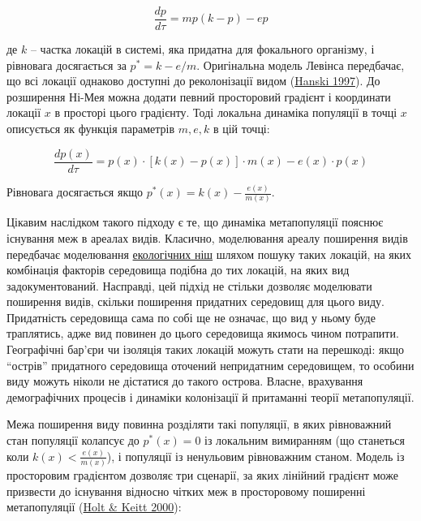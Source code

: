 \documentclass[
  11pt,
]{book}
\begin{document}
\[\frac{dp}{d\tau} = mp(k - p) - ep\]

де \(k\) -- частка локацій в системі, яка придатна для фокального організму, і рівновага досягається за \(p^* = k - e/m\). Оригінальна модель Левінса передбачає, що всі локації однаково доступні до реколонізації видом (\href{htpps://doi.org/10.1016/B978-012323445-2/50007-9}{Hanski 1997}). До розширення Ні-Мея можна додати певний просторовий градієнт і координати локації \(x\) в просторі цього градієнту. Тоді локальна динаміка популяції в точці \(x\) описується як функція параметрів \(m,e,k\) в цій точці:

\[\frac{dp(x)}{d\tau} = p(x) \cdot [k(x) - p(x)] \cdot m(x) - e(x) \cdot p(x)\]

Рівновага досягається якщо \(p^*(x) = k(x) - \frac{e(x)}{m(x)}\).

Цікавим наслідком такого підходу є те, що динаміка метапопуляції пояснює існування меж в ареалах видів. Класично, моделювання ареалу поширення видів передбачає моделювання \hyperref[niche]{екологічних ніш} шляхом пошуку таких локацій, на яких комбінація факторів середовища подібна до тих локацій, на яких вид задокументований. Насправді, цей підхід не стільки дозволяє моделювати поширення видів, скільки поширення придатних середовищ для цього виду. Придатність середовища сама по собі ще не означає, що вид у ньому буде траплятись, адже вид повинен до цього середовища якимось чином потрапити. Географічні бар'єри чи ізоляція таких локацій можуть стати на перешкоді: якщо ``острів'' придатного середовища оточений непридатним середовищем, то особини виду можуть ніколи не дістатися до такого острова. Власне, врахування демографічних процесів і динаміки колонізації й притаманні теорії метапопуляції.

Межа поширення виду повинна розділяти такі популяції, в яких рівноважний стан популяції колапсує до \(p^*(x) = 0\) із локальним вимиранням (що станеться коли \(k(x) < \frac{e(x)}{m(x)}\)), і популяції із ненульовим рівноважним станом. Модель із просторовим градієнтом дозволяє три сценарії, за яких лінійний градієнт може призвести до існування відносно чітких меж в просторовому поширенні метапопуляції (\href{htpps://doi.org/10.1046/j.1461-0248.2000.00116.x}{Holt \& Keitt 2000}):
\end{document}

